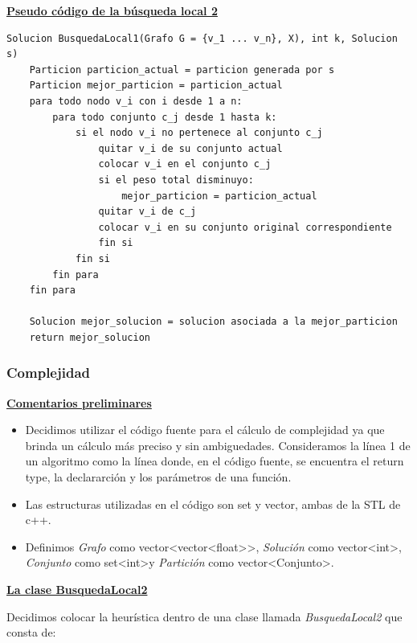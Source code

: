 \documentclass[10pt,a4paper]{article}
\begin{document}
\noindent \textbf{\underline{Pseudo código de la búsqueda local 2}}

\begin{lstlisting}
Solucion BusquedaLocal1(Grafo G = {v_1 ... v_n}, X), int k, Solucion s)
	Particion particion_actual = particion generada por s
	Particion mejor_particion = particion_actual
	para todo nodo v_i con i desde 1 a n:
		para todo conjunto c_j desde 1 hasta k:
			si el nodo v_i no pertenece al conjunto c_j
				quitar v_i de su conjunto actual
				colocar v_i en el conjunto c_j
				si el peso total disminuyo:
					mejor_particion = particion_actual
				quitar v_i de c_j
				colocar v_i en su conjunto original correspondiente
				fin si
			fin si
		fin para
	fin para
	
	Solucion mejor_solucion = solucion asociada a la mejor_particion
	return mejor_solucion
\end{lstlisting}

\subsubsection{Complejidad}

\noindent \textbf{\underline{Comentarios preliminares}}
\begin{itemize}
\item Decidimos utilizar el código fuente para el cálculo de complejidad ya que brinda un cálculo más preciso y sin ambiguedades. Consideramos la línea 1 de un algoritmo como la línea donde, en el código fuente, se encuentra el return type, la declararción y los parámetros de una función.
\item Las estructuras utilizadas en el código son set y vector, ambas de la STL de c++.
\item Definimos \textit{Grafo} como vector\textless vector\textless float\textgreater \textgreater, \textit{Solución} como vector\textless int\textgreater, \textit{Conjunto} como set\textless int\textgreater y \textit{Partición} como vector\textless Conjunto\textgreater .
\end{itemize}

\noindent \textbf{\underline{La clase BusquedaLocal2}}

Decidimos colocar la heurística dentro de una clase llamada \textit{BusquedaLocal2} que consta de:
\end{document}
